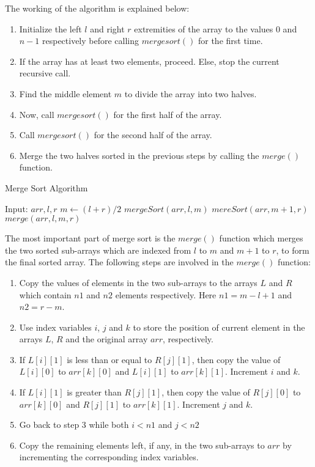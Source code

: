 \documentclass[letterpaper, 11 pt, conference]{ieeeconf}  %
\begin{document}
The working of the algorithm is explained below:

\begin{enumerate}
\item Initialize the left $l$ and right $r$  extremities of the array to the values $0$ and $n-1$ respectively before calling $mergesort()$ for the first time.
\item If the array has at least two elements, proceed. Else, stop the current recursive call.
\item Find the middle element $m$ to divide the array into two halves.
\item Now, call $mergesort()$ for the first half of the array.
\item Call $mergesort()$ for the second half of the array.
\item Merge the two halves sorted in the previous steps by calling the $merge()$ function.
\end{enumerate}

\begin{algorithm}
\caption{Merge Sort Algorithm}\label{alg:driver}
\begin{algorithmic}
\State Input: $arr, l, r$
  \State $m \gets (l + r)/2$
  \State $mergeSort(arr, l, m)$
  \State $mereSort(arr, m+1, r)$
  \State $merge(arr, l, m, r)$
\EndIf
\end{algorithmic}
\end{algorithm}

The most important part of merge sort is the $merge()$ function which merges the two sorted sub-arrays which are indexed from $l$ to $m$ and $m+1$ to $r$, to form the final sorted array. The following steps are involved in the $merge()$ function:

\begin{enumerate}
\item Copy the values of elements in the two sub-arrays to the arrays $L$ and $R$ which contain $n1$ and $n2$ elements respectively. Here $n1 = m-l+1$ and $n2 = r-m$.
\item Use index variables $i$, $j$ and $k$ to store the position of current element in the arrays $L$, $R$ and the original array $arr$, respectively.
\item If $L[i][1]$ is less than or equal to $R[j][1]$, then copy the value of $L[i][0]$ to $arr[k][0]$ and $L[i][1]$ to $arr[k][1]$. Increment $i$ and $k$.
\item If $L[i][1]$ is greater than $R[j][1]$, then copy the value of $R[j][0]$ to $arr[k][0]$ and $R[j][1]$ to $arr[k][1]$. Increment $j$ and $k$.
\item Go back to step 3 while both $i < n1$ and $j < n2$
\item Copy the remaining elements left, if any, in the two sub-arrays to $arr$ by incrementing the corresponding index variables.
\end{enumerate}
\end{document}
